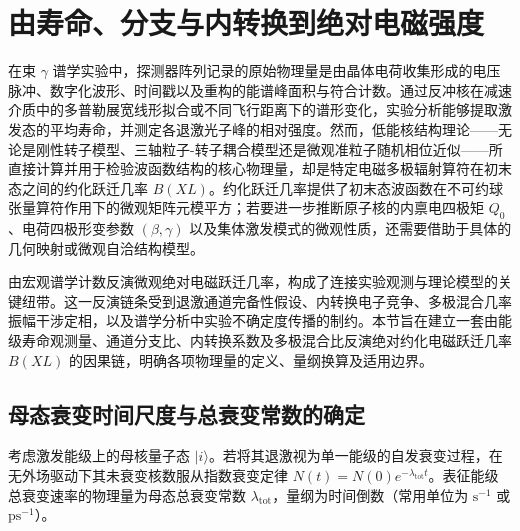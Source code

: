 \section{由寿命、分支与内转换到绝对电磁强度}\label{sec:5-9}

在束 $\gamma$ 谱学实验中，探测器阵列记录的原始物理量是由晶体电荷收集形成的电压脉冲、数字化波形、时间戳以及重构的能谱峰面积与符合计数。通过反冲核在减速介质中的多普勒展宽线形拟合或不同飞行距离下的谱形变化，实验分析能够提取激发态的平均寿命，并测定各退激光子峰的相对强度。然而，低能核结构理论——无论是刚性转子模型、三轴粒子-转子耦合模型还是微观准粒子随机相位近似——所直接计算并用于检验波函数结构的核心物理量，却是特定电磁多极辐射算符在初末态之间的约化跃迁几率 $B(XL)$。约化跃迁几率提供了初末态波函数在不可约球张量算符作用下的微观矩阵元模平方；若要进一步推断原子核的内禀电四极矩 $Q_0$、电荷四极形变参数 $(\beta, \gamma)$ 以及集体激发模式的微观性质，还需要借助于具体的几何映射或微观自洽结构模型。

由宏观谱学计数反演微观绝对电磁跃迁几率，构成了连接实验观测与理论模型的关键纽带。这一反演链条受到退激通道完备性假设、内转换电子竞争、多极混合几率振幅干涉定相，以及谱学分析中实验不确定度传播的制约。本节旨在建立一套由能级寿命观测量、通道分支比、内转换系数及多极混合比反演绝对约化电磁跃迁几率 $B(XL)$ 的因果链，明确各项物理量的定义、量纲换算及适用边界。

\subsection{母态衰变时间尺度与总衰变常数的确定}\label{subsec:5-9-1}

考虑激发能级上的母核量子态 $|i\rangle$。若将其退激视为单一能级的自发衰变过程，在无外场驱动下其未衰变核数服从指数衰变定律 $N(t) = N(0) e^{-\lambda_{\text{tot}} t}$。表征能级总衰变速率的物理量为母态总衰变常数 $\lambda_{\text{tot}}$，量纲为时间倒数（常用单位为 $\text{s}^{-1}$ 或 $\text{ps}^{-1}$）。

